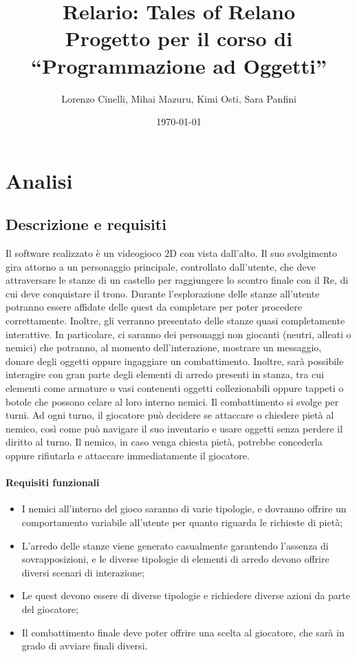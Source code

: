 \documentclass[a4paper,12pt]{report}
\title{Relario: Tales of Relano\\Progetto per il corso di\\``Programmazione ad Oggetti''}
\author{Lorenzo Cinelli, Mihai Mazuru, Kimi Osti, Sara Panfini}
\date{\today}
\begin{document}
\maketitle

\tableofcontents

\chapter{Analisi}


\section{Descrizione e requisiti}

Il software realizzato è un videogioco 2D con vista dall’alto. Il suo svolgimento gira attorno a un personaggio principale, controllato dall’utente, che deve attraversare le stanze di un castello per raggiungere lo scontro finale con il Re, di cui deve conquistare il trono.
%
\newline Durante l’esplorazione delle stanze all’utente potranno essere affidate delle quest da completare per poter procedere correttamente.
%
\newline Inoltre, gli verranno presentato delle stanze quasi completamente interattive. In particolare, ci saranno dei personaggi non giocanti (neutri, alleati o nemici) che potranno, al momento dell’interazione, mostrare un messaggio, donare degli oggetti oppure ingaggiare un combattimento. Inoltre, sarà possibile interagire con gran parte degli elementi di arredo presenti in stanza, tra cui elementi come armature o vasi contenenti oggetti collezionabili oppure tappeti o botole che possono celare al loro interno nemici.
%
\newline Il combattimento si svolge per turni. Ad ogni turno, il giocatore può decidere se attaccare o chiedere pietà al nemico, così come può navigare il suo inventario e usare oggetti senza perdere il diritto al turno. Il nemico, in caso venga chiesta pietà, potrebbe concederla oppure rifiutarla e attaccare immediatamente il giocatore. 

\subsubsection{Requisiti funzionali}
\begin{itemize}
	\item I nemici all'interno del gioco saranno di varie tipologie, e dovranno offrire un comportamento variabile all'utente per quanto riguarda le richieste di pietà;
	\item L'arredo delle stanze viene generato casualmente garantendo l'assenza di sovrapposizioni, e le diverse tipologie di elementi di arredo devono offrire diversi scenari di interazione;
	\item Le quest devono essere di diverse tipologie e richiedere diverse azioni da parte del giocatore;
	\item Il combattimento finale deve poter offrire una scelta al giocatore, che sarà in grado di avviare finali diversi.
\end{itemize}
\end{document}
